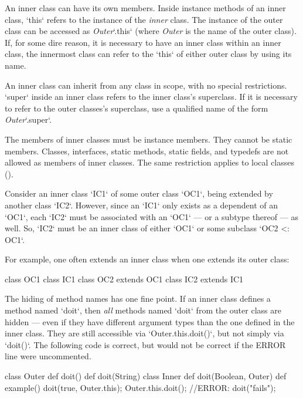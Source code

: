 An inner class can have its own members.  
Inside instance methods of an inner class, \xcd`this` refers to the instance
of the {\em inner} class.  The instance of the outer class can be accessed as
{\em Outer}\xcd`.this` (where {\em Outer} is the name of the outer class).
If, for some dire reason, it is necessary to have an inner class within an inner
class, the innermost class can refer to the \xcd`this` of either outer class
by using its name.

An inner class can inherit from any class in scope,
with no special restrictions. \xcd`super` inside an inner class refers to the
inner class's superclass. If it is necessary to refer to the outer classes's
superclass, use a qualified name of the form {\em Outer}\xcd`.super`.

The members of inner classes must be instance members.  They cannot be static
members.  Classes, interfaces, static methods, static fields, and typedefs are
not allowed as members of inner classes. 
The same restriction applies to local classes ().

Consider
an inner class \xcd`IC1` of some outer class \xcd`OC1`, being extended by 
another class \xcd`IC2`. However, since an \xcd`IC1` only exists as a
dependent of an \xcd`OC1`, each \xcd`IC2` must be associated with an \xcd`OC1`
--- or a subtype thereof --- as well.   So, \xcd`IC2` must be an inner class
of either \xcd`OC1` or some subclass \xcd`OC2 <: OC1`.

\begin{ex}For example, one often extends an
inner class when one extends its outer class: 
\begin{xten}
class OC1 {
   class IC1 {}
}
class OC2 extends OC1 {
   class IC2 extends IC1 {} 
}
\end{xten}
%
\end{ex}


The hiding of method names has one fine point.  If an inner class defines a
method named \xcd`doit`, then {\em all} methods named \xcd`doit` from the
outer class are hidden --- even if they have different argument types than the
one defined in the inner class.
They are still accessible via
\xcd`Outer.this.doit()`, but not simply via \xcd`doit()`.  The following code
is correct, but would not be correct if the ERROR line were uncommented.

\begin{xten}
class Outer {
  def doit() {}
  def doit(String) {}
  class Inner { 
     def doit(Boolean, Outer) {}
     def example() {
        doit(true, Outer.this);
        Outer.this.doit();
        //ERROR: doit("fails");
     }
  }
}
\end{xten}
%


